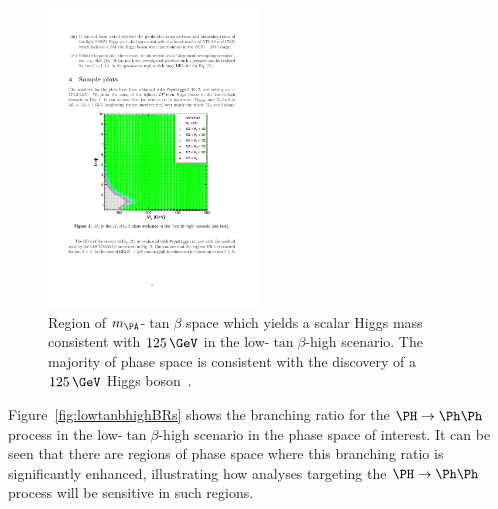 \begin{figure}[htbp]
   \includegraphics[width=0.5\textwidth]{plots/theory/low-tanb-high-mass.pdf}
\caption[Region of $m_{\PA}$-$\tan\beta$ space which yields a scalar Higgs mass 
consistent with $125\,\GeV$ in the low-$\tan\beta$-high scenario.]{
    Region of $m_{\PA}$-$\tan\beta$ space which yields a scalar Higgs mass 
consistent with $125\,\GeV$ in the low-$\tan\beta$-high scenario. The
majority of phase space is consistent with the discovery of a $125\,\GeV$ Higgs
boson~\cite{lowtanbhighwiki}.}
\label{fig:lowtanbhighmass}
\end{figure}

Figure~\ref{fig:lowtanbhighBRs} shows the branching ratio for the $\PH\to\Ph\Ph$
process in the low-$\tan\beta$-high scenario in the phase space of interest. It
can be seen that there are regions of phase space where this branching ratio is
significantly enhanced, illustrating how analyses targeting the $\PH\to\Ph\Ph$ process will be
sensitive in such regions.

